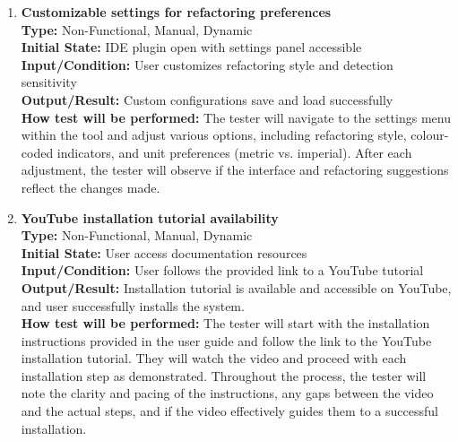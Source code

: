 \documentclass[12pt, titlepage]{article}
\begin{document}
\begin{enumerate}[label={\bf \textcolor{Maroon}{test-UH-\arabic*}},
    wide=0pt, font=\itshape]
  \item \textbf{Customizable settings for refactoring preferences} \\[2mm]
    \textbf{Type:} Non-Functional, Manual, Dynamic \\
    \textbf{Initial State:} IDE plugin open with settings panel accessible \\
    \textbf{Input/Condition:} User customizes refactoring style and
    detection sensitivity \\
    \textbf{Output/Result:} Custom configurations save and load
    successfully \\[2mm]
    \textbf{How test will be performed:} The tester will navigate to
    the settings menu within the tool and adjust various options,
    including refactoring style, colour-coded indicators, and unit
    preferences (metric vs. imperial). After each adjustment, the
    tester will observe if the interface and refactoring suggestions
    reflect the changes made.

  \item \textbf{YouTube installation tutorial availability} \\[2mm]
    \textbf{Type:} Non-Functional, Manual, Dynamic \\
    \textbf{Initial State:} User access documentation resources \\
    \textbf{Input/Condition:} User follows the provided link to a
    YouTube tutorial \\
    \textbf{Output/Result:} Installation tutorial is available and
    accessible on YouTube, and user successfully installs the system. \\[2mm]
    \textbf{How test will be performed:} The tester will start with
    the installation instructions provided in the user guide and
    follow the link to the YouTube installation tutorial. They will
    watch the video and proceed with each installation step as
    demonstrated. Throughout the process, the tester will note the
    clarity and pacing of the instructions, any gaps between the
    video and the actual steps, and if the video effectively guides
    them to a successful installation.


\end{enumerate}
\end{document}
